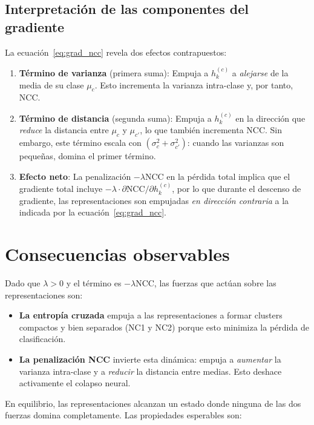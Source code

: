 \documentclass[12pt,a4paper]{report}
\newcommand{\NCC}{\text{NCC}}
\begin{document}
\subsection{Interpretación de las componentes del gradiente}

La ecuación~\eqref{eq:grad_ncc} revela dos efectos contrapuestos:

\begin{enumerate}
    \item \textbf{Término de varianza} (primera suma): Empuja a $h_k^{(c)}$ a \emph{alejarse} de la media de su clase $\mu_c$. Esto incrementa la varianza intra-clase y, por tanto, NCC.

    \item \textbf{Término de distancia} (segunda suma): Empuja a $h_k^{(c)}$ en la dirección que \emph{reduce} la distancia entre $\mu_c$ y $\mu_{c'}$, lo que también incrementa NCC. Sin embargo, este término escala con $(\sigma_c^2 + \sigma_{c'}^2)$: cuando las varianzas son pequeñas, domina el primer término.

    \item \textbf{Efecto neto}: La penalización $-\lambda\NCC$ en la pérdida total implica que el gradiente total incluye $-\lambda \cdot \partial\NCC/\partial h_k^{(c)}$, por lo que durante el descenso de gradiente, las representaciones son empujadas \emph{en dirección contraria} a la indicada por la ecuación~\eqref{eq:grad_ncc}.
\end{enumerate}

\section{Consecuencias observables}

Dado que $\lambda > 0$ y el término es $-\lambda\NCC$, las fuerzas que actúan sobre las representaciones son:

\begin{itemize}
    \item \textbf{La entropía cruzada} empuja a las representaciones a formar clusters compactos y bien separados (NC1 y NC2) porque esto minimiza la pérdida de clasificación.

    \item \textbf{La penalización NCC} invierte esta dinámica: empuja a \emph{aumentar} la varianza intra-clase y a \emph{reducir} la distancia entre medias. Esto deshace activamente el colapso neural.
\end{itemize}

En equilibrio, las representaciones alcanzan un estado donde ninguna de las dos fuerzas domina completamente. Las propiedades esperables son:
\end{document}
